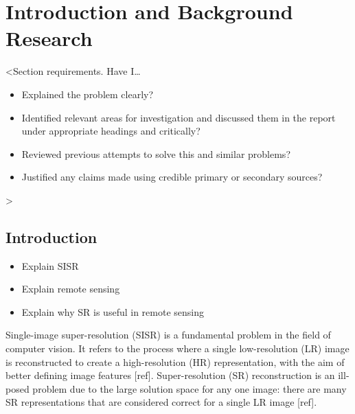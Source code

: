 \chapter{Introduction and Background Research}

\label{chapter1}

<Section requirements. Have I\dots
\begin{itemize}
    \item Explained the problem clearly?
    \item Identified relevant areas for investigation and discussed them in the report under appropriate headings and critically?
    \item Reviewed previous attempts to solve this and similar problems?
    \item Justified any claims made using credible primary or secondary sources?
\end{itemize}
>

\section{Introduction}

\begin{itemize}
    \item Explain SISR
    \item Explain remote sensing
    \item Explain why SR is useful in remote sensing
\end{itemize}

Single-image super-resolution (SISR) is a fundamental problem in the field of computer vision. It refers to the process where a single low-resolution (LR) image is reconstructed to create a high-resolution (HR) representation, with the aim of better defining image features [ref]. Super-resolution (SR) reconstruction is an ill-posed problem due to the large solution space for any one image: there are many SR representations that are considered correct for a single LR image [ref].

